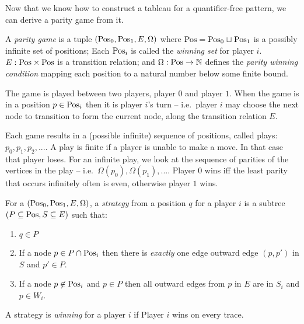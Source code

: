 Now that we know how to construct a tableau for a quantifier-free pattern,
we can derive a parity game from it.

\begin{definition}A \emph{parity game} is a tuple \((\mathrm{Pos}_0, \mathrm{Pos}_1, E, \Omega)\)
where \(\mathrm{Pos} = \mathrm{Pos}_0 \mathrel{\sqcup} \mathrm{Pos}_1\) is a possibly infinite set of positions;
Each \(\mathrm{Pos}_i\) is called the \emph{winning set} for player \(i\).
\(E : \mathrm{Pos} \times \mathrm{Pos}\) is a transition relation;
and \(\Omega : \mathrm{Pos} \to \mathbb{N}\) defines the \emph{parity winning condition}
mapping each position to a natural number below some finite bound.\end{definition}

The game is played between two players, player \(0\) and player \(1\).
When the game is in a position \(p \in \mathrm{Pos}_i\) then it is player \(i\)'s turn -- i.e.~player \(i\) may choose
the next node to transition to form the current node, along the transition relation \(E\).

\begin{definition}[Plays]Each game results in a (possible infinite) sequence of positions, called plays: \(p_0, p_1, p_2,...\).
A play is finite if a player is unable to make a move. In that case that player loses.
For an infinite play, we look at the sequence of parities of the vertices in the play
-- i.e.~\(\Omega(p_0), \Omega(p_1), ...\).
Player \(0\) wins iff the least parity that occurs infinitely often is even, otherwise player \(1\) wins.\end{definition}

\begin{definition}For a \((\mathrm{Pos}_0, \mathrm{Pos}_1, E, \Omega)\),
a \emph{strategy} from a position \(q\) for a player \(i\) is a subtree \((P \subseteq \mathrm{Pos}, S \subseteq E)\) such that:

\begin{enumerate}
\def\labelenumi{\arabic{enumi}.}
\tightlist
\item
  \(q \in P\)
\item
  If a node \(p \in P \cap \mathrm{Pos}_i\)
  then there is \emph{exactly} one edge outward edge \((p, p')\) in \(S\) and \(p' \in P\).
\item
  If a node \(p \not\in \mathrm{Pos}_i\) and \(p \in P\) then all outward edges from \(p\) in \(E\) are in \(S_i\) and \(p \in W_i\).
\end{enumerate}

A strategy is \emph{winning} for a player \(i\) if Player \(i\) wins on every trace.\end{definition}

